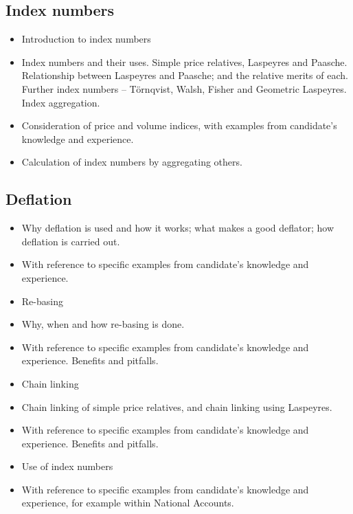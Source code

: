 \subsection*{Index numbers}
\begin{itemize}
\item	Introduction to index numbers
\item	Index numbers and their uses. Simple price relatives, Laspeyres and Paasche. Relationship between Laspeyres and Paasche; and the relative merits of each. Further index numbers – Törnqvist, Walsh, Fisher and Geometric Laspeyres. Index aggregation.
\item	Consideration of price and volume indices, with examples from candidate’s knowledge and experience.
\item	Calculation of index numbers by aggregating others.
\end{itemize}
\subsection*{Deflation}
\begin{itemize}
\item	Why deflation is used and how it works; what makes a good deflator; how deflation is carried out.
\item	With reference to specific examples from candidate’s knowledge and experience.
\item	Re-basing
\item	Why, when and how re-basing is done.
\item	With reference to specific examples from candidate’s knowledge and experience. Benefits and pitfalls.
\item	Chain linking
\item	Chain linking of simple price relatives, and chain linking using Laspeyres.
\item	With reference to specific examples from candidate’s knowledge and experience. Benefits and pitfalls.
\item	Use of index numbers
\item	With reference to specific examples from candidate’s knowledge and experience, for example within National Accounts.
\end{itemize}

